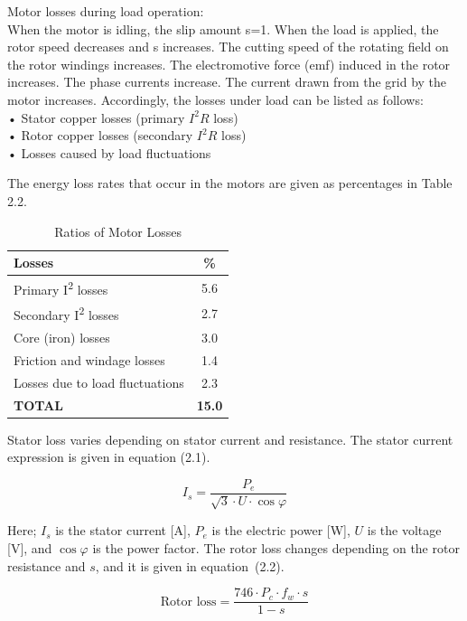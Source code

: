 Motor losses during load operation: \\
When the motor is idling, the slip amount s=1. When the load is applied, the rotor speed decreases and s increases. The cutting speed of the rotating field on the rotor windings increases. The electromotive force (emf) induced in the rotor increases. The phase currents increase. The current drawn from the grid by the motor increases. Accordingly, the losses under load can be listed as follows:\\
• Stator copper losses (primary $I^2R$ loss)\\
• Rotor copper losses (secondary $I^2R$ loss)\\
• Losses caused by load fluctuations

The energy loss rates that occur in the motors are given as percentages in Table 2.2.


\begin{table}[h!]
\centering
\begin{tabular}{|l|c|}
\hline
\textbf{Losses} & \textbf{\%} \\ \hline
Primary I\textsuperscript{2} losses & 5.6 \\ \hline
Secondary I\textsuperscript{2} losses & 2.7 \\ \hline
Core (iron) losses & 3.0 \\ \hline
Friction and windage losses & 1.4 \\ \hline
Losses due to load fluctuations & 2.3 \\ \hline
\textbf{TOTAL} & \textbf{15.0} \\ \hline
\end{tabular}
\caption{Ratios of Motor Losses}
\label{tab:losses}
\end{table}

Stator loss varies depending on stator current and resistance. The stator current expression is given in equation (2.1).

\begin{equation}
I_s = \frac{P_e}{\sqrt{3} \cdot U \cdot \cos\varphi}
\end{equation}

Here; $I_s$ is the stator current [A], $P_e$ is the electric power [W], 
$U$ is the voltage [V], and $\cos\varphi$ is the power factor. 
The rotor loss changes depending on the rotor resistance and $s$, 
and it is given in equation~(2.2).

\begin{equation}
\text{Rotor loss} = \frac{746 \cdot P_c \cdot f_w \cdot s}{1 - s}
\end{equation}


